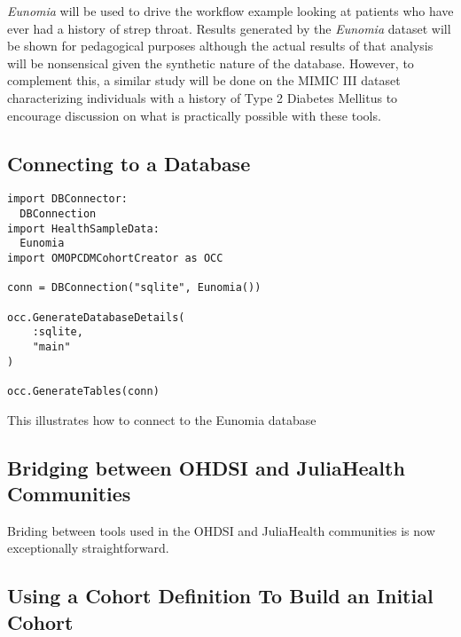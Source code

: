 \documentclass{juliacon}
\begin{document}
\textit{Eunomia} will be used to drive the workflow example looking at patients who have ever had a history of strep throat.
Results generated by the \textit{Eunomia} dataset will be shown for pedagogical purposes although the actual results of that analysis will be nonsensical given the synthetic nature of the database.
However, to complement this, a similar study will be done on the MIMIC III dataset characterizing individuals with a history of Type 2 Diabetes Mellitus to encourage discussion on what is practically possible with these tools.

\subsection{Connecting to a Database}


\begin{listing}[!ht]
\begin{verbatim}
import DBConnector: 
  DBConnection
import HealthSampleData: 
  Eunomia
import OMOPCDMCohortCreator as OCC

conn = DBConnection("sqlite", Eunomia())

occ.GenerateDatabaseDetails(
    :sqlite,
    "main"
)

occ.GenerateTables(conn)
\end{verbatim}
\caption{This illustrates how to connect to the Eunomia database}
\label{listing:connection}
\end{listing}

\subsection{Bridging between OHDSI and JuliaHealth Communities}

Briding between tools used in the OHDSI and JuliaHealth communities is now exceptionally straightforward.


\subsection{Using a Cohort Definition To Build an Initial Cohort}
\end{document}
